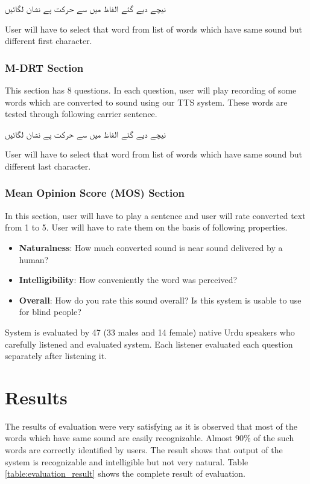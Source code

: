   \texturdu{نیچے دیے گئے الفاظ میں سے حرکت پے نشان لگائیں}

User will have to select that word from list of words which have same sound but different first character.

\subsubsection{M-DRT Section}

This section has 8 questions. In each question, user will play recording of some words which are converted to sound using our TTS system. These words are tested through following carrier sentence.

  \texturdu{نیچے دیے گئے الفاظ میں سے حرکت پے نشان لگائیں}

User will have to select that word from list of words which have same sound but different last character.

\subsubsection{Mean Opinion Score (MOS) Section}
In this section, user will have to play a sentence and user will rate converted text from 1 to 5. User will have to rate them on the basis of following properties.

\begin{itemize}
  \item {\textbf{Naturalness}:} How much converted sound is near sound delivered by a human?
  \item {\textbf{Intelligibility}:} How conveniently the word was perceived?
  \item {\textbf{Overall}:} How do you rate this sound overall? Is this system is usable to use for blind people?
\end{itemize}

System is evaluated by 47 (33 males and 14 female) native Urdu speakers who carefully listened and evaluated system. Each listener evaluated each question separately after listening it.

\section{Results}

The results of evaluation were very satisfying as it is observed that most of the words which have same sound are easily recognizable. Almost 90\% of the such words are correctly identified by users. The result shows that output of the system is recognizable and intelligible but not very natural. Table \ref{table:evaluation_result} shows the complete result of evaluation.

